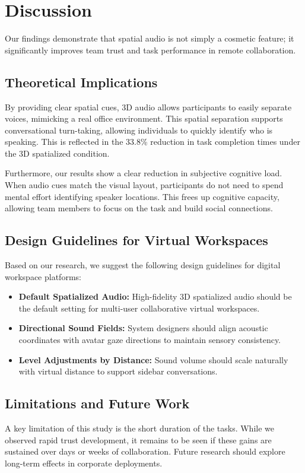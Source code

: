 \section{Discussion}
Our findings demonstrate that spatial audio is not simply a cosmetic feature; it significantly improves team trust and task performance in remote collaboration.

\subsection{Theoretical Implications}
By providing clear spatial cues, 3D audio allows participants to easily separate voices, mimicking a real office environment. This spatial separation supports conversational turn-taking, allowing individuals to quickly identify who is speaking. This is reflected in the 33.8\% reduction in task completion times under the 3D spatialized condition.

Furthermore, our results show a clear reduction in subjective cognitive load. When audio cues match the visual layout, participants do not need to spend mental effort identifying speaker locations. This frees up cognitive capacity, allowing team members to focus on the task and build social connections.

\subsection{Design Guidelines for Virtual Workspaces}
Based on our research, we suggest the following design guidelines for digital workspace platforms:
\begin{itemize}
\item \textbf{Default Spatialized Audio:} High-fidelity 3D spatialized audio should be the default setting for multi-user collaborative virtual workspaces.
\item \textbf{Directional Sound Fields:} System designers should align acoustic coordinates with avatar gaze directions to maintain sensory consistency.
\item \textbf{Level Adjustments by Distance:} Sound volume should scale naturally with virtual distance to support sidebar conversations.
\end{itemize}

\subsection{Limitations and Future Work}
A key limitation of this study is the short duration of the tasks. While we observed rapid trust development, it remains to be seen if these gains are sustained over days or weeks of collaboration. Future research should explore long-term effects in corporate deployments.
